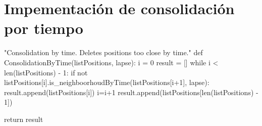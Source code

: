 \documentclass[a4paper, 12pt]{article}
\begin{document}
\newpage
\section{Impementaci\'on de consolidaci\'on por tiempo} \label{App:AppendixF}

\begin{python}
"Consolidation by time. Deletes positions too close by time."
def ConsolidationByTime(listPositions, lapse):
	i = 0
	result = []
	while i < len(listPositions) - 1:
		if not listPositions[i].is_neighboorhoudByTime(listPositions[i+1], lapse):
			result.append(listPositions[i])
		i=i+1
	result.append(listPositions[len(listPositions) - 1])

	return result
\end{python}




\newpage
\end{document}
